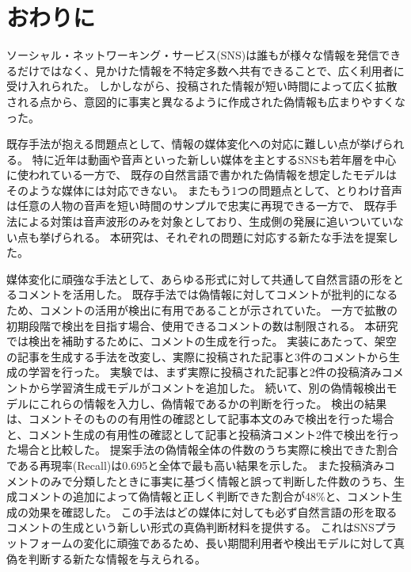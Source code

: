 \chapter{おわりに}\label{ch:conclusion}
ソーシャル・ネットワーキング・サービス(SNS)は誰もが様々な情報を発信できるだけではなく、見かけた情報を不特定多数へ共有できることで、広く利用者に受け入れられた。
しかしながら、投稿された情報が短い時間によって広く拡散される点から、意図的に事実と異なるように作成された偽情報も広まりやすくなった。

既存手法が抱える問題点として、情報の媒体変化への対応に難しい点が挙げられる。
特に近年は動画や音声といった新しい媒体を主とするSNSも若年層を中心に使われている一方で、
既存の自然言語で書かれた偽情報を想定したモデルはそのような媒体には対応できない。
またもう1つの問題点として、とりわけ音声は任意の人物の音声を短い時間のサンプルで忠実に再現できる一方で、
既存手法による対策は音声波形のみを対象としており、生成側の発展に追いついていない点も挙げられる。
本研究は、それぞれの問題に対応する新たな手法を提案した。

媒体変化に頑強な手法として、あらゆる形式に対して共通して自然言語の形をとるコメントを活用した。
既存手法では偽情報に対してコメントが批判的になるため、コメントの活用が検出に有用であることが示されていた。
一方で拡散の初期段階で検出を目指す場合、使用できるコメントの数は制限される。
本研究では検出を補助するために、コメントの生成を行った。
実装にあたって、架空の記事を生成する手法を改変し、実際に投稿された記事と3件のコメントから生成の学習を行った。
実験では、まず実際に投稿された記事と2件の投稿済みコメントから学習済生成モデルがコメントを追加した。
続いて、別の偽情報検出モデルにこれらの情報を入力し、偽情報であるかの判断を行った。
検出の結果は、コメントそのものの有用性の確認として記事本文のみで検出を行った場合と、コメント生成の有用性の確認として記事と投稿済コメント2件で検出を行った場合と比較した。
提案手法の偽情報全体の件数のうち実際に検出できた割合である再現率(Recall)は0.695と全体で最も高い結果を示した。
また投稿済みコメントのみで分類したときに事実に基づく情報と誤って判断した件数のうち、生成コメントの追加によって偽情報と正しく判断できた割合が48\%と、コメント生成の効果を確認した。
この手法はどの媒体に対しても必ず自然言語の形を取るコメントの生成という新しい形式の真偽判断材料を提供する。
これはSNSプラットフォームの変化に頑強であるため、長い期間利用者や検出モデルに対して真偽を判断する新たな情報を与えられる。


